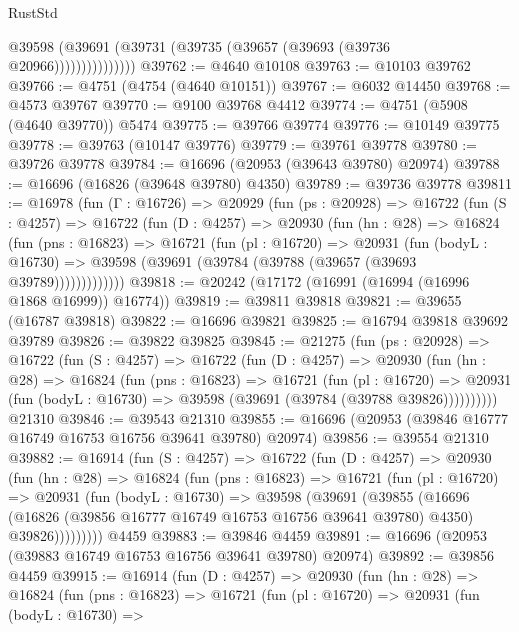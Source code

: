 \begin{lexlean}{RustStd}
\begin{coremodule}
                    @39598 (@39691 (@39731 (@39735 (@39657 (@39693 (@39736 @20966)))))))))))))))
@39762 := @4640 @10108
@39763 := @10103 @39762
@39766 := @4751 (@4754 (@4640 @10151))
@39767 := @6032 @14450
@39768 := @4573 @39767
@39770 := @9100 @39768 @4412
@39774 := @4751 (@5908 (@4640 @39770)) @5474
@39775 := @39766 @39774
@39776 := @10149 @39775
@39778 := @39763 (@10147 @39776)
@39779 := @39761 @39778
@39780 := @39726 @39778
@39784 := @16696 (@20953 (@39643 @39780) @20974)
@39788 := @16696 (@16826 (@39648 @39780) @4350)
@39789 := @39736 @39778
@39811 := @16978
    (fun (Γ : @16726) =>
    @20929
      (fun (ps : @20928) =>
      @16722
        (fun (S : @4257) =>
        @16722
          (fun (D : @4257) =>
          @20930
            (fun (hn : @28) =>
            @16824
              (fun (pns : @16823) =>
              @16721
                (fun (pl : @16720) =>
                @20931
                  (fun (bodyL : @16730) =>
                  @39598 (@39691 (@39784 (@39788 (@39657 (@39693 @39789)))))))))))))
@39818 := @20242 (@17172 (@16991 (@16994 (@16996 @1868 @16999)) @16774))
@39819 := @39811 @39818
@39821 := @39655 (@16787 @39818)
@39822 := @16696 @39821
@39825 := @16794 @39818 @39692 @39789
@39826 := @39822 @39825
@39845 := @21275
    (fun (ps : @20928) =>
    @16722
      (fun (S : @4257) =>
      @16722
        (fun (D : @4257) =>
        @20930
          (fun (hn : @28) =>
          @16824
            (fun (pns : @16823) =>
            @16721
              (fun (pl : @16720) =>
              @20931 (fun (bodyL : @16730) => @39598 (@39691 (@39784 (@39788 @39826))))))))))
    @21310
@39846 := @39543 @21310
@39855 := @16696 (@20953 (@39846 @16777 @16749 @16753 @16756 @39641 @39780) @20974)
@39856 := @39554 @21310
@39882 := @16914
    (fun (S : @4257) =>
    @16722
      (fun (D : @4257) =>
      @20930
        (fun (hn : @28) =>
        @16824
          (fun (pns : @16823) =>
          @16721
            (fun (pl : @16720) =>
            @20931
              (fun (bodyL : @16730) =>
              @39598
                (@39691
                  (@39855
                    (@16696
                      (@16826 (@39856 @16777 @16749 @16753 @16756 @39641 @39780) @4350)
                      @39826)))))))))
    @4459
@39883 := @39846 @4459
@39891 := @16696 (@20953 (@39883 @16749 @16753 @16756 @39641 @39780) @20974)
@39892 := @39856 @4459
@39915 := @16914
    (fun (D : @4257) =>
    @20930
      (fun (hn : @28) =>
      @16824
        (fun (pns : @16823) =>
        @16721
          (fun (pl : @16720) =>
          @20931
            (fun (bodyL : @16730) =>

\end{coremodule}
\end{lexlean}
